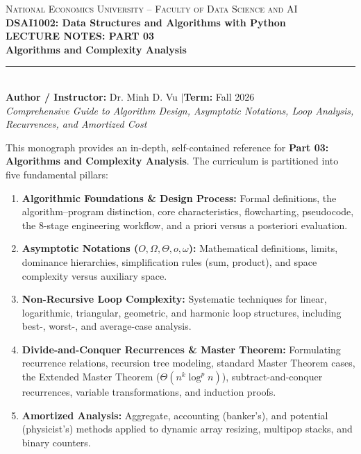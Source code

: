\documentclass[11pt,a4paper]{article}
\begin{document}
\begin{tcolorbox}[
    enhanced,
    colback=SoftGreen,
    colframe=ForestGreen,
    boxrule=1.5pt,
    arc=3mm,
    left=5mm, right=5mm, top=6mm, bottom=6mm
]
\begin{center}
    {\Large\scshape National Economics University -- Faculty of Data Science and AI}\\[0.3em]
    {\large\textbf{\color{DarkBlue}DSAI1002: Data Structures and Algorithms with Python}}\\[0.8em]
    {\Huge\bfseries\color{ForestGreen} LECTURE NOTES: PART 03}\\[0.4em]
    {\LARGE\bfseries\color{DarkGray} Algorithms and Complexity Analysis}\\[0.8em]
    \rule{0.7\textwidth}{0.8pt}\\[0.6em]
    {\normalsize\textbf{Author / Instructor:} Dr. Minh D. Vu \quad$|$\quad \textbf{Term:} Fall 2026}\\[0.2em]
    {\small\textit{Comprehensive Guide to Algorithm Design, Asymptotic Notations, Loop Analysis, Recurrences, and Amortized Cost}}
\end{center}
\end{tcolorbox}

\vspace{0.5em}

\begin{notebox}
This monograph provides an in-depth, self-contained reference for \textbf{Part 03: Algorithms and Complexity Analysis}. The curriculum is partitioned into five fundamental pillars:
\begin{enumerate}[itemsep=1pt,topsep=2pt]
    \item \textbf{Algorithmic Foundations \& Design Process:} Formal definitions, the algorithm--program distinction, core characteristics, flowcharting, pseudocode, the 8-stage engineering workflow, and a priori versus a posteriori evaluation.
    \item \textbf{Asymptotic Notations ($O, \Omega, \Theta, o, \omega$):} Mathematical definitions, limits, dominance hierarchies, simplification rules (sum, product), and space complexity versus auxiliary space.
    \item \textbf{Non-Recursive Loop Complexity:} Systematic techniques for linear, logarithmic, triangular, geometric, and harmonic loop structures, including best-, worst-, and average-case analysis.
    \item \textbf{Divide-and-Conquer Recurrences \& Master Theorem:} Formulating recurrence relations, recursion tree modeling, standard Master Theorem cases, the Extended Master Theorem ($\Theta(n^k \log^p n)$), subtract-and-conquer recurrences, variable transformations, and induction proofs.
    \item \textbf{Amortized Analysis:} Aggregate, accounting (banker's), and potential (physicist's) methods applied to dynamic array resizing, multipop stacks, and binary counters.
\end{enumerate}
\end{notebox}
\end{document}
